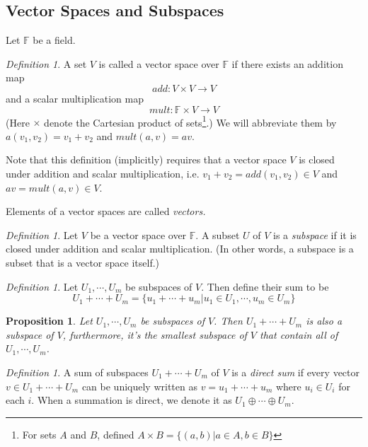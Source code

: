 \documentclass[12pt]{amsart}
\newcommand{\fff}[0]{\mathbb{F}}
\newtheorem{proposition}[theorem]{Proposition}
\theoremstyle{remark}
\newtheorem{definition}[theorem]{Definition}
\numberwithin{equation}{section}
\begin{document}
\subsection{Vector Spaces and Subspaces}
Let $\fff$ be a field.
\begin{definition}\label{def:vs}
	A set $V$ is called a vector space over $\fff$ if there exists an addition map
	\[add:V\times V\to V\]
	and a scalar multiplication map
	\[mult:\fff\times V\to V\]
	(Here $\times$ denote the Cartesian product of sets\footnote{For sets $A$ and $B$, defined $A\times B=\{(a,b)|a\in A,b\in B\}$}.) We will abbreviate them by $a(v_1,v_2)=v_1+v_2$ and $mult(a,v)=av$.
	
	Note that this definition (implicitly) requires that a vector space $V$ is closed under addition and scalar multiplication, i.e. $v_1+v_2=add(v_1,v_2)\in V$ and $av = mult(a,v)\in V$.
	
	Elements of a vector spaces are called \emph{vectors.}
\end{definition}

\begin{definition}\label{def:subspace}
	Let $V$ be a vector space over $\fff$. A subset $U$ of $V$ is a \emph{subspace} if it is closed under addition and scalar multiplication. (In other words, a subspace is a subset that is a vector space itself.)
\end{definition}
\begin{definition}\label{def:sum}
	Let $U_1,\cdots,U_m$ be subspaces of $V$. Then define their sum to be
	\[U_1+\cdots+U_m = \{u_1+\cdots+u_m|u_1\in U_1,\cdots,u_m\in U_m\}\]
\end{definition}
\begin{proposition}
	Let $U_1,\cdots,U_m$ be subspaces of $V$. Then $U_1+\cdots+U_m$ is also a subspace of $V$, furthermore, it's the smallest subspace of $V$ that contain all of $U_1,\cdots,U_m$.
\end{proposition}
\begin{definition}
	A sum of subspaces $U_1+\cdots+U_m$ of $V$ is a \emph{direct sum} if every vector $v\in U_1+\cdots+U_m$ can be uniquely written as $v=u_1+\cdots+u_m$ where $u_i\in U_i$ for each $i$. When a summation is direct, we denote it as $U_1\oplus\cdots\oplus U_m$.
\end{definition}
\end{document}
